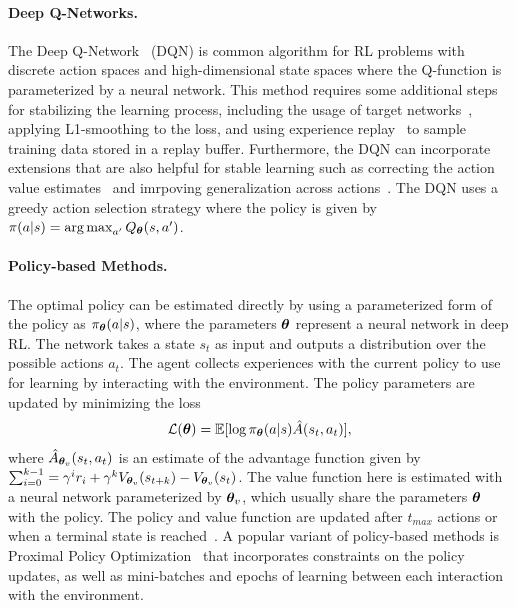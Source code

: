 \paragraph{Deep Q-Networks.} The Deep Q-Network~\cite{mnih2013playing, mnih2015human} (DQN) is common algorithm for RL problems with discrete action spaces and high-dimensional state spaces where the Q-function is parameterized by a neural network. This method requires some additional steps for stabilizing the learning process, including the usage of target networks~\cite{mnih2013playing}, applying L1-smoothing to the loss, and using experience replay~\cite{lin1992self} to sample training data stored in a replay buffer. Furthermore, the DQN can incorporate extensions that are also helpful for stable learning such as correcting the action value estimates~\cite{van2016deep} and imrpoving generalization across actions~\cite{wang2016dueling}. The DQN uses a greedy action selection strategy where the policy is given by $\pi(a|s) = \operatorname*{arg\,max}_{a'} Q_{{\bm{\theta}}}(s, a')$. 

\paragraph{Policy-based Methods.} The optimal policy can be estimated directly by using a parameterized form of the policy as $\pi_{{\bm{\theta}}}(a | s)$, where the parameters ${\bm{\theta}}$ represent a neural network in deep RL. The network takes a state $s_t$ as input and outputs a distribution over the possible actions $a_t$. The agent collects experiences with the current policy to use for learning by interacting with the environment. The policy parameters are updated by minimizing the loss 
\begin{align}
	{\mathcal{L}}({\bm{\theta}}) = \mathbb{E}[\log \pi_{{\bm{\theta}}}(a | s) \hat{A}(s_t, a_t)],
\end{align}
where $\hat{A}_{{\bm{\theta}}_v}(s_t, a_t)$ is an estimate of the advantage function given by $\sum_{i=0}^{k-1} = \gamma^{i} r_i + \gamma^{k} V_{{\bm{\theta}}_v}(s_{t+k}) - V_{{\bm{\theta}}_v}(s_{t})$. The value function here is estimated with a neural network parameterized by ${\bm{\theta}}_v$, which usually share the parameters ${\bm{\theta}}$ with the policy. The policy and value function are updated after $t_{max}$ actions or when a terminal state is reached~\cite{mnih2016asynchronous}. A popular variant of policy-based methods is Proximal Policy Optimization~\cite{schulman2017proximal} that incorporates constraints on the policy updates, as well as mini-batches and epochs of learning between each interaction with the environment. 

